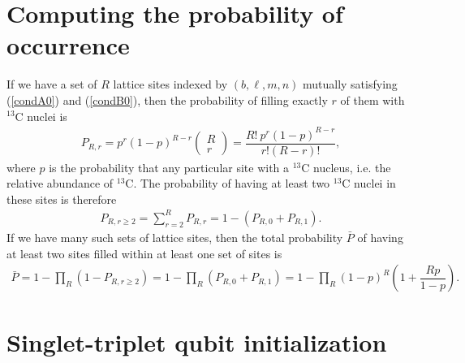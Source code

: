 \documentclass[11pt]{article}
\newcommand{\f}[2]{\dfrac{#1}{#2}} %
\newcommand{\p}[1]{\left(#1\right)} %
\renewcommand{\l}{\ell} %
\newcommand{\m}[1]{\begin{pmatrix}#1\end{pmatrix}} %
\begin{document}
\section*{Computing the probability of occurrence}

If we have a set of $R$ lattice sites indexed by $(b,\l,m,n)$ mutually
satisfying (\ref{condA0}) and (\ref{condB0}), then the probability of
filling exactly $r$ of them with $^{13}$C nuclei is
\begin{align}
  P_{R,r}=p^r\p{1-p}^{R-r}\m{R\\r}=\f{R!~p^r\p{1-p}^{R-r}}{r!\p{R-r}!},
\end{align}
where $p$ is the probability that any particular site with a $^{13}$C
nucleus, i.e. the relative abundance of $^{13}$C. The probability of
having at least two $^{13}$C nuclei in these sites is therefore
\begin{align}
  P_{R,r\ge2}=\sum_{r=2}^RP_{R,r}=1-\p{P_{R,0}+P_{R,1}}.
\end{align}
If we have many such sets of lattice sites, then the total probability
$\bar P$ of having at least two sites filled within at least one set
of sites is
\begin{align}
  \bar P=1-\prod_R\p{1-P_{R,r\ge2}} =1-\prod_R\p{P_{R,0}+P_{R,1}}
  =1-\prod_R\p{1-p}^R\p{1+\f{Rp}{1-p}}.
\end{align}

\newpage
\section*{Singlet-triplet qubit initialization}
\end{document}
